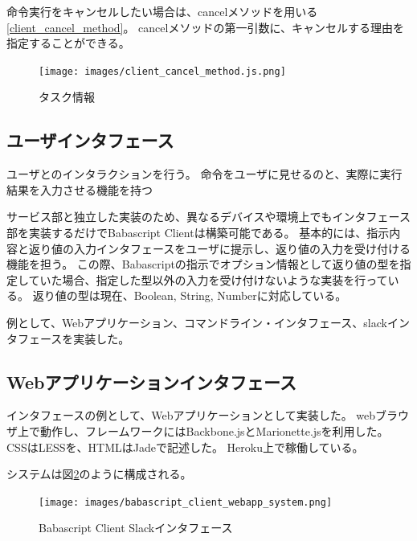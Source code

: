 命令実行をキャンセルしたい場合は、cancelメソッドを用いる\ref{client_cancel_method}。
cancelメソッドの第一引数に、キャンセルする理由を指定することができる。

\begin{figure}[htbp]
  \begin{center}
  \texttt{[image: images/client\_cancel\_method.js.png]}
  \end{center}
  \caption{タスク情報}
  \label{fig:client_cancel_method}
\end{figure}

\subsection{ユーザインタフェース}\label{ux30e6ux30fcux30b6ux30a4ux30f3ux30bfux30d5ux30a7ux30fcux30b9}

ユーザとのインタラクションを行う。
命令をユーザに見せるのと、実際に実行結果を入力させる機能を持つ

サービス部と独立した実装のため、異なるデバイスや環境上でもインタフェース部を実装するだけでBabascript
Clientは構築可能である。
基本的には、指示内容と返り値の入力インタフェースをユーザに提示し、返り値の入力を受け付ける機能を担う。
この際、Babascriptの指示でオプション情報として返り値の型を指定していた場合、指定した型以外の入力を受け付けないような実装を行っている。
返り値の型は現在、Boolean, String, Numberに対応している。

例として、Webアプリケーション、コマンドライン・インタフェース、slackインタフェースを実装した。

\subsection{Webアプリケーションインタフェース}\label{webux30a2ux30d7ux30eaux30b1ux30fcux30b7ux30e7ux30f3ux30a4ux30f3ux30bfux30d5ux30a7ux30fcux30b9}

インタフェースの例として、Webアプリケーションとして実装した。
webブラウザ上で動作し、フレームワークにはBackbone.jsとMarionette.jsを利用した。
CSSはLESSを、HTMLはJadeで記述した。 Heroku上で稼働している。

システムは図\ref{fig:babascript_client_webapp_system}のように構成される。

\begin{figure}[htbp]
  \begin{center}
  \texttt{[image: images/babascript\_client\_webapp\_system.png]}
  \end{center}
  \caption{Babascript Client Slackインタフェース}
  \label{fig:babascript_client_webapp_system}
\end{figure}

